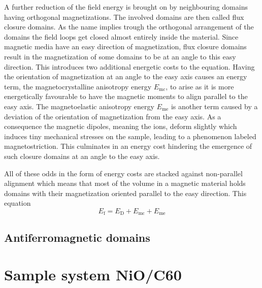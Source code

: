A further reduction of the field energy is brought on by neighbouring domains having orthogonal magnetizations.
The involved domains are then called flux closure domains.
As the name implies trough the orthogonal arrangement of the domains the field loops get closed almost entirely inside the material.
Since magnetic media have an easy direction of magnetization, flux closure domains result in the magnetization of some domains to be at an angle to this easy direction.
This introduces two additional energetic costs to the equation.
Having the orientation of magnetization at an angle to the easy axis causes an energy term, the magnetocrystalline anisotropy energy $E_{\text{mc}}$, to arise as it is more energetically favourable to have the magnetic moments to align parallel to the easy axis.
The magnetoelastic anisotropy energy $E_{\text{me}}$ is another term caused by a deviation of the orientation of magnetization from the easy axis.
As a consequence the magnetic dipoles, meaning the ions, deform slightly which induces tiny mechanical stresses on the sample, leading to a phenomenon labeled magnetostriction.
This culminates in an energy cost hindering the emergence of such closure domains at an angle to the easy axis.

All of these odds in the form of energy costs are stacked against non-parallel alignment which means that most of the volume in a magnetic material holds domains with their magnetization oriented parallel to the easy direction.
This equation
\begin{equation}
    E_{\text{f}} = E_{\text{D}} + E_{\text{mc}} + E_{\text{me}}
    \label{eqn:landau_lifschitz_energy}
\end{equation}


\subsection{Antiferromagnetic domains}

\section{Sample system NiO/C60}
